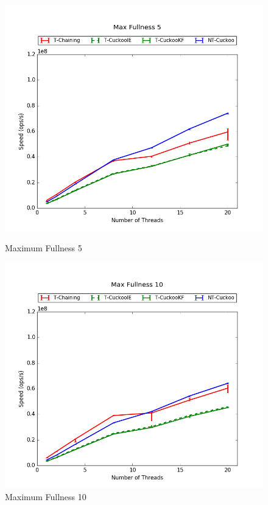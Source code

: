 \begin{figure}[H]
    \centering
	\begin{minipage}{0.45\textwidth}\includegraphics[width=\textwidth]{maps/5HM1M:F90,I5,E5.png} 
        \caption*{Maximum Fullness 5}
    \end{minipage}
	\begin{minipage}{0.45\textwidth}\includegraphics[width=\textwidth]{maps/10HM1M:F90,I5,E5.png} 
        \caption*{Maximum Fullness 10}

\end{minipage}
\end{figure}

